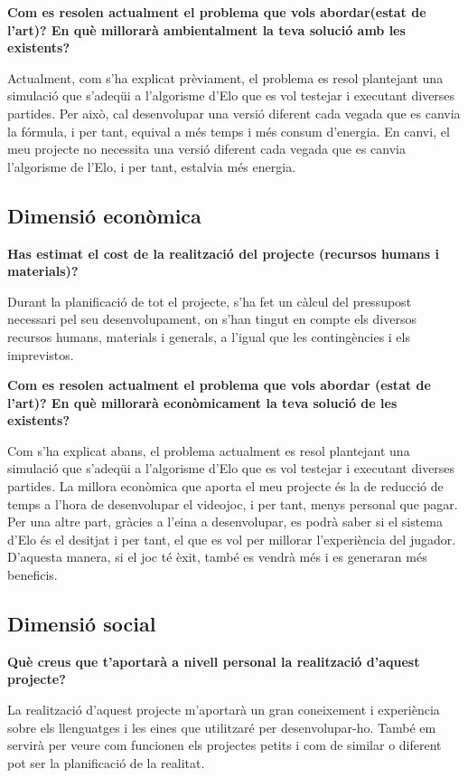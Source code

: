 \documentclass[a4paper]{article}
\begin{document}
\newpage

\textbf{Com es resolen actualment el problema que vols abordar(estat de l'art)? En què millorarà ambientalment la teva solució amb les existents?}

Actualment, com s'ha explicat prèviament, el problema es resol plantejant una simulació que s'adeqüi a l'algorisme d'Elo que es vol testejar i executant diverses partides. Per això, cal desenvolupar una versió diferent cada vegada que es canvia la fórmula, i per tant, equival a més temps i més consum d'energia. En canvi, el meu projecte no necessita una versió diferent cada vegada que es canvia l'algorisme de l'Elo, i per tant, estalvia més energia.

\subsection{Dimensió econòmica}

\textbf{Has estimat el cost de la realització del projecte (recursos humans i materials)?}

Durant la planificació de tot el projecte, s'ha fet un càlcul del pressupost necessari pel seu desenvolupament, on s'han tingut en compte els diversos recursos humans, materials i generals, a l'igual que les contingències i els imprevistos.

\textbf{Com es resolen actualment el problema que vols abordar (estat de l'art)? En què millorarà econòmicament la teva solució de les existents?}

Com s'ha explicat abans, el problema actualment es resol plantejant una simulació que s'adeqüi a l'algorisme d'Elo que es vol testejar i executant diverses partides. La millora econòmica que aporta el meu projecte és la de reducció de temps a l'hora de desenvolupar el videojoc, i per tant, menys personal que pagar. Per una altre part, gràcies a l'eina a desenvolupar, es podrà saber si el sistema d'Elo és el desitjat i per tant, el que es vol per millorar l'experiència del jugador. D'aquesta manera, si el joc té èxit, també es vendrà més i es generaran més beneficis. 

\subsection{Dimensió social}

\textbf{Què creus que t'aportarà a nivell personal la realització d'aquest projecte?}

La realització d'aquest projecte m'aportarà un gran coneixement i experiència sobre els llenguatges i les eines que utilitzaré per desenvolupar-ho. També em servirà per veure com funcionen els projectes petits i com de similar o diferent pot ser la planificació de la realitat.
\end{document}
